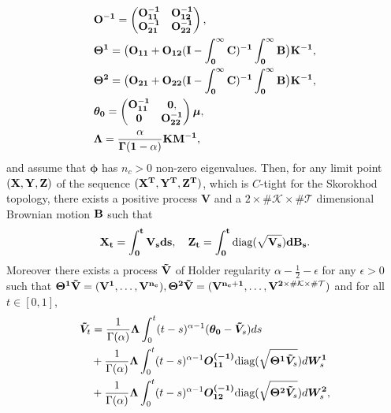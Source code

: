 \documentclass[12pt]{article}
\begin{document}
\begin{align*}
\allowdisplaybreaks
 &  \bf{O^{-1}} = \begin{pmatrix}
 \bf{O^{-1}_{11}} & \bf{O^{-1}_{12}} \\
 \bf{O^{-1}_{21}} & \bf{O^{-1}_{22}}
\end{pmatrix},  \\
& \bf{\Theta^1} = \big( \bf{O}_{11} + \bf{O}_{12}(\bf{I} - \int_0^\infty \bf{C})^{-1}\int_0^\infty \bf{B}\big)\bf{K}^{-1}, \\
& \bf{\Theta^2} = \big( \bf{O}_{21} + \bf{O}_{22}(\bf{I} - \int_0^\infty \bf{C})^{-1}\int_0^\infty \bf{B}\big)\bf{K}^{-1},  \\
& \boldsymbol{\theta_0} = \begin{pmatrix}
 \bf{O^{-1}_{11}} & \bf{0}, \\
 \bf{0} & \bf{O^{-1}_{22}}
\end{pmatrix} \boldsymbol{\mu}, \\
& \bf{\Lambda} = \frac{\alpha}{\Gamma(1-\alpha)}\bf{KM^{-1}},
\end{align*}
and assume that $\boldsymbol{\phi}$ has $n_c>0$ non-zero eigenvalues. Then, for any limit point $(\bf{X,Y,Z})$ of the sequence $(\bf{X^T,Y^T,Z^T})$, which is $C$-tight for the Skorokhod topology, there exists a positive process $\mathbf{V}$ and a $2\times\#\mathcal{K}\times\#\mathcal{T}$ dimensional Brownian motion $\bf{B}$ such that 
\begin{align*}
    \bf{X_t} = \int_0^t \bf{V_s}ds, \quad \bf{Z_t} = \int_0^t \text{diag}(\sqrt{\bf{V_s}})d\bf{B}_s.
\end{align*}
Moreover there exists a process $\bf{\tilde{V}}$ of Holder regularity $\alpha-\frac{1}{2}-\epsilon$ for any $\epsilon>0$ such that $\bf{\Theta^1\tilde{V}}= (V^1,\dots,V^{n_c}),\bf{\Theta^2\tilde{V}}= (V^{n_c+1},\dots,V^{2\times\#\mathcal{K}\times\#\mathcal{T}})$ and for all $t\in [0,1]$,
\begin{equation*}
    \begin{split}
        \bm{\Tilde{V}}_t &= \dfrac{1}{\Gamma(\alpha)}\bm{\Lambda} \int_0^t (t-s)^{\alpha-1}(\bm{\theta_0} - \bm{\Tilde{V}}_s) ds  \\ &+\dfrac{1}{\Gamma(\alpha)}\bm{\Lambda} \int_0^t (t-s)^{\alpha-1} \bm{O^{(-1)}_{11}}\textnormal{diag}(\sqrt{\bm{\Theta^1} \bm{\Tilde{V}}_s}) d\bm{W^1}_s 
        \\ &+\dfrac{1}{\Gamma(\alpha)}\bm{\Lambda} \int_0^t (t-s)^{\alpha-1} \bm{O^{(-1)}_{12}}\textnormal{diag}(\sqrt{\bm{\Theta^2} \bm{\Tilde{V}}_s}) d\bm{W^2}_s,
    \end{split}
\end{equation*}
\end{document}
